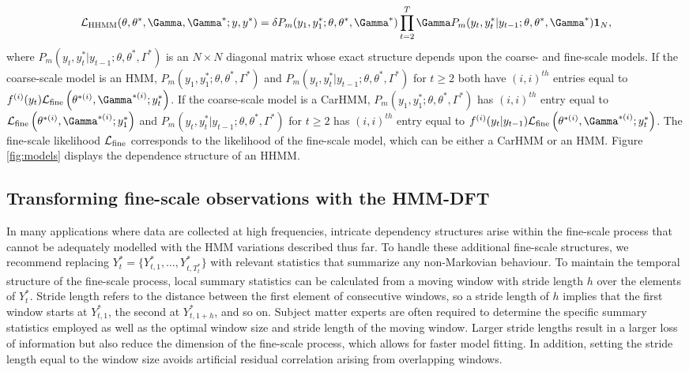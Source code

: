 \begin{equation}
    \calL_{\text{HHMM}}(\theta,\theta^*,\Gamma,\Gamma^*;y,y^*) = \delta P_m(y_1,y_1^*;\theta,\theta^*,\Gamma^*) \prod_{t=2}^T \Gamma P_m(y_t,y_t^*|y_{t-1};\theta,\theta^*,\Gamma^*) \mathbf{1}_N,
    \label{eqn:HHMM_likelihood}
\end{equation}
%
where $P_m(y_t,y_t^*|y_{t-1};\theta,\theta^*,\Gamma^*)$ is an $N \times N$ diagonal matrix whose exact structure depends upon the coarse- and fine-scale models. If the coarse-scale model is an HMM, $P_m(y_1,y_1^*;\theta,\theta^*,\Gamma^*)$ and $P_m(y_t,y_t^*|y_{t-1};\theta,\theta^*,\Gamma^*)$ for $t \geq 2$ both have $(i,i)^{th}$ entries equal to 
$f^{(i)}(y_t)\calL_{\text{fine}}\left(\theta^{*(i)},
\Gamma^{*(i)};y_t^*\right)$. 
If the coarse-scale model is a CarHMM, $P_m(y_1,y_1^*;\theta,\theta^*,\Gamma^*)$ has $(i,i)^{th}$ entry equal to $\calL_{\text{fine}}\left(\theta^{*(i)},
\Gamma^{*(i)};y_1^*\right)$ and $P_m(y_t,y_t^*|y_{t-1};\theta,\theta^*,\Gamma^*)$ for $t \geq 2$ has $(i,i)^{th}$ entry equal to $f^{(i)}(y_t|y_{t-1})\calL_{\text{fine}}\left(\theta^{*(i)},
\Gamma^{*(i)};y_t^*\right)$.
The fine-scale likelihood $\mathcal{L}_{\text{fine}}$ corresponds to the likelihood of the fine-scale model, which can be either a CarHMM or an HMM. Figure \ref{fig:models} displays the dependence structure of an HHMM.

\subsection{Transforming fine-scale observations with the HMM-DFT}
\label{subsec:STFT}

In many applications where data are collected at high frequencies, intricate dependency structures arise within the fine-scale process that cannot be adequately modelled with the HMM variations described thus far. To handle these additional fine-scale structures, we recommend replacing $Y^*_t = \{Y^*_{t,1},\ldots,Y^*_{t,T^*_t}\}$ with relevant statistics that summarize any non-Markovian behaviour. To maintain the temporal structure of the fine-scale process, local summary statistics can be calculated from a moving window with stride length $h$ over the elements of $Y^*_t$. Stride length refers to the distance between the first element of consecutive windows, so a stride length of $h$ implies that the first window starts at $Y^*_{t,1}$, the second at $Y^*_{t,1+h}$, and so on. Subject matter experts are often required to determine the specific summary statistics employed as well as the optimal window size and stride length of the moving window. Larger stride lengths result in a larger loss of information but also reduce the dimension of the fine-scale process, which allows for faster model fitting. In addition, setting the stride length equal to the window size avoids artificial residual correlation arising from overlapping windows. 

